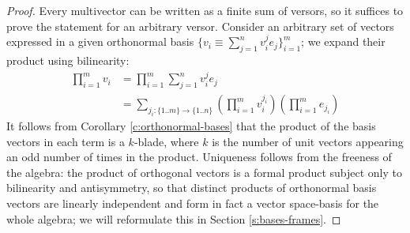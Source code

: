 \begin{proof}
	Every multivector can be written as a finite sum of versors, so it suffices to prove the statement for an arbitrary versor.
	Consider an arbitrary set of vectors expressed in a given orthonormal basis $\{v_i \equiv \sum_{j=1}^n v_i^je_j\}_{i=1}^m$; we expand their product using bilinearity:
	\begin{align*}
		\prod_{i=1}^m v_i &= \prod_{i=1}^m \sum_{j=1}^n v_i^j e_j \\
						  &= \sum_{j_i : \{1..m\} \to \{1..n\}} \left(\prod_{i=1}^m v_i^{j_i}\right) \left(\prod_{i=1}^m e_{j_i}\right)
	\end{align*}
	It follows from Corollary \ref{c:orthonormal-bases} that the product of the basis vectors in each term is a $k$-blade, where $k$ is the number of unit vectors appearing an odd number of times in the product.
	Uniqueness follows from the freeness of the algebra: the product of orthogonal vectors is a formal product subject only to bilinearity and antisymmetry, so that distinct products of orthonormal basis vectors are linearly independent and form in fact a vector space-basis for the whole algebra; we will reformulate this in Section \ref{s:bases-frames}.
\end{proof}

